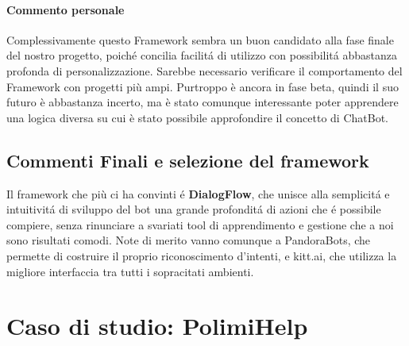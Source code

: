 \documentclass[]{article}
\begin{document}
\paragraph{Commento personale}
Complessivamente questo Framework sembra un buon candidato alla fase finale del nostro progetto, poiché concilia facilitá di utilizzo con possibilitá abbastanza profonda di personalizzazione. Sarebbe necessario verificare il comportamento del Framework con progetti più ampi. Purtroppo è ancora in fase beta, quindi il suo futuro è abbastanza incerto, ma è stato comunque interessante poter apprendere una logica diversa su cui è stato possibile approfondire il concetto di ChatBot.


\subsection{Commenti Finali e selezione del framework}
Il framework che più ci ha convinti é \textbf{DialogFlow}, che unisce alla semplicitá e intuitivitá di sviluppo del bot una grande profonditá di azioni che é possibile compiere, senza rinunciare a svariati tool di apprendimento e gestione che a noi sono risultati comodi. Note di merito vanno comunque a PandoraBots, che permette di costruire il proprio riconoscimento d'intenti, e kitt.ai, che utilizza la migliore interfaccia tra tutti i sopracitati ambienti. 

\section{Caso di studio: PolimiHelp}
\end{document}
